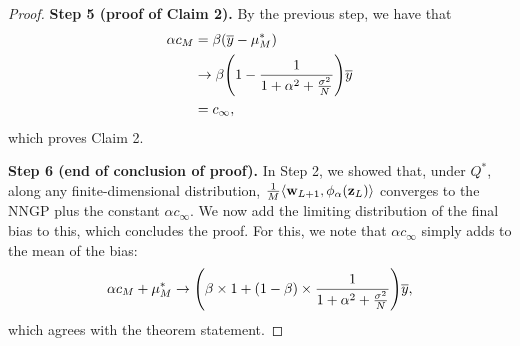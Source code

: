 \documentclass[twoside]{article}
\newcommand{\vw}{\mathbf{w}}
\newcommand{\vz}{\mathbf{z}}
\DeclarePairedDelimiter\parens{(}{)}             %
\DeclarePairedDelimiter\lra{\langle}{\rangle}    %
\theoremstyle{theoremstyle}
\begin{document}
\begin{proof}
    \textbf{Step 5 (proof of Claim 2).}
    By the previous step, we have that
    \begin{align}
        \alpha c_M
        &= \beta (\overline{y} - \mu^*_M) \\
        &\to \beta \parens*{1 - \frac{1}{1 + \alpha^2 + \frac{\sigma^2}{N}}} \overline{y} \\
        &= c_\infty,
    \end{align}
    which proves Claim 2.
    
    \textbf{Step 6 (end of conclusion of proof).}
    In Step 2, we showed that, under $Q^*$, along any finite-dimensional distribution, $\tfrac{1}{M}\lra{\vw_{L+1}, \phi_\alpha(\vz_L)}$ converges to the NNGP plus the constant $\alpha c_\infty$.
    We now add the limiting distribution of the final bias to this, which concludes the proof.
    For this, we note that $\alpha c_\infty$ simply adds to the mean of the bias:
    \begin{equation}
        \alpha c_M + \mu^*_M \to \parens*{\beta \times 1 + (1 - \beta) \times \frac{1}{1 + \alpha^2 + \frac{\sigma^2}{N}}} \overline{y},
    \end{equation}
    which agrees with the theorem statement.
\end{proof}
\end{document}
